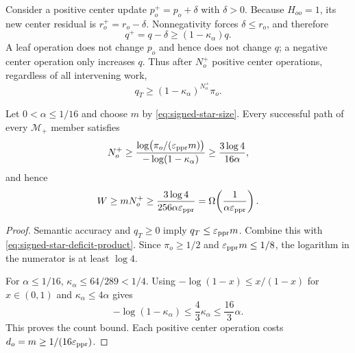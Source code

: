 Consider a positive center update $p_o^+=p_o+\delta$ with $\delta>0$.
Because $H_{oo}=1$, its new center residual is $r_o^+=r_o-\delta$.
Nonnegativity forces $\delta\le r_o$, and therefore
\begin{equation}
  q^+=q-\delta
  \ge(1-\kappa_\alpha)q.
  \label{eq:signed-star-deficit-contraction-limit}
\end{equation}
A leaf operation does not change $p_o$ and hence does not change $q$; a
negative center operation only increases $q$.  Thus after $N_o^+$ positive
center operations, regardless of all intervening work,
\begin{equation}
  q_T\ge(1-\kappa_\alpha)^{N_o^+}\pi_o.
  \label{eq:signed-star-deficit-product}
\end{equation}

\begin{theorem}
\label{thm:signed-star-monotone-lower}
Let $0<\alpha\le1/16$ and choose $m$ by
\eqref{eq:signed-star-size}.  Every successful path of every
$\mathcal M_+$ member satisfies
\begin{equation}
  N_o^+
  \ge
  \frac{\log\bigl(\pi_o/(\varepsilon_{\rm ppr}m)\bigr)}
       {-\log(1-\kappa_\alpha)}
  \ge\frac{3\log4}{16\alpha},
  \label{eq:signed-star-monotone-center-count}
\end{equation}
and hence
\begin{equation}
  W
  \ge mN_o^+
  \ge\frac{3\log4}
           {256\alpha\varepsilon_{\rm ppr}}
  =\Omega\!\left(
      \frac{1}{\alpha\varepsilon_{\rm ppr}}
    \right).
  \label{eq:signed-star-monotone-work}
\end{equation}
\end{theorem}

\begin{proof}
Semantic accuracy and $q_T\ge0$ imply
$q_T\le\varepsilon_{\rm ppr}m$.  Combine this with
\eqref{eq:signed-star-deficit-product}.  Since
$\pi_o\ge1/2$ and $\varepsilon_{\rm ppr}m\le1/8$, the logarithm in the
numerator is at least $\log4$.

For $\alpha\le1/16$,
$\kappa_\alpha\le64/289<1/4$.  Using
$-\log(1-x)\le x/(1-x)$ for $x\in(0,1)$ and
$\kappa_\alpha\le4\alpha$ gives
\begin{equation*}
  -\log(1-\kappa_\alpha)
  \le\frac43\kappa_\alpha
  \le\frac{16}{3}\alpha.
\end{equation*}
This proves the count bound.  Each positive center operation costs
$d_o=m\ge1/(16\varepsilon_{\rm ppr})$.
\end{proof}

